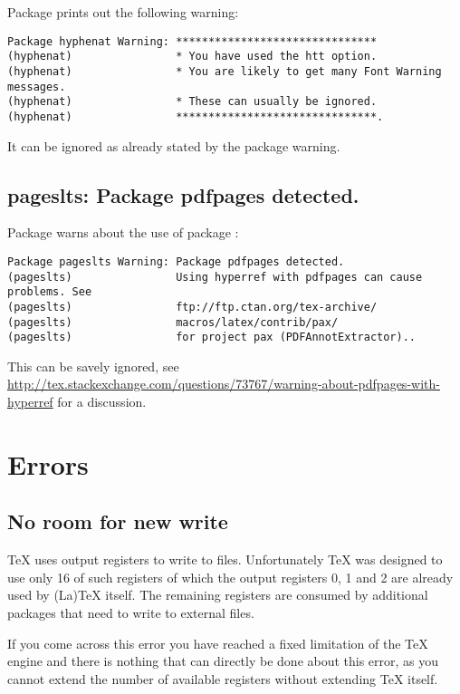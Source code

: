 Package  prints out the following warning:
%
\begin{verbatim}
Package hyphenat Warning: *******************************
(hyphenat)                * You have used the htt option.
(hyphenat)                * You are likely to get many Font Warning messages.
(hyphenat)                * These can usually be ignored.
(hyphenat)                *******************************.
\end{verbatim}
%
It can be ignored as already stated by the package warning.

\subsection{pageslts: Package pdfpages detected.}

Package  warns about the use of package :
%
\begin{verbatim}
Package pageslts Warning: Package pdfpages detected.
(pageslts)                Using hyperref with pdfpages can cause problems. See
(pageslts)                ftp://ftp.ctan.org/tex-archive/
(pageslts)                macros/latex/contrib/pax/
(pageslts)                for project pax (PDFAnnotExtractor)..
\end{verbatim}
%
This can be savely ignored, see \url{http://tex.stackexchange.com/questions/73767/warning-about-pdfpages-with-hyperref} for a discussion.

\section{Errors}

\subsection{No room for new write}
\label{sec:problems:write}

TeX uses output registers to write to files. Unfortunately TeX was designed to use only 16 of such registers of which the output registers 0, 1 and 2 are already used by (La)TeX itself. The remaining registers are consumed by additional packages that need to write to external files.

If you come across this error you have reached a fixed limitation of the TeX engine and there is nothing that can directly be done about this error, as you cannot extend the number of available registers without extending TeX itself.

